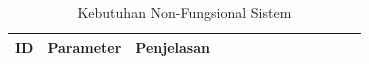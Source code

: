 
\begin{table}[h]
	\caption{Kebutuhan Non-Fungsional Sistem}
	\vspace{0.25cm}
	\begin{center}
		\begin{tabular}{|c|c|p{0.7\linewidth}|}
			\hline
			\textbf{ID} & \textbf{Parameter} & \textbf{Penjelasan} \\ \hline
			
		\end{tabular}
	\end{center}
\end{table}


